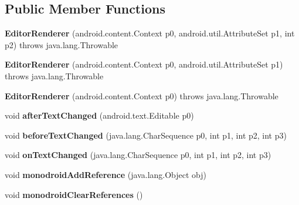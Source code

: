 \subsection*{Public Member Functions}
\begin{DoxyCompactItemize}
\item 
\mbox{\label{classmd5b60ffeb829f638581ab2bb9b1a7f4f3f_1_1EditorRenderer_a126a5ef185db22511cc66e9cafd0d310}} 
{\bfseries Editor\+Renderer} (android.\+content.\+Context p0, android.\+util.\+Attribute\+Set p1, int p2)  throws java.\+lang.\+Throwable 	
\item 
\mbox{\label{classmd5b60ffeb829f638581ab2bb9b1a7f4f3f_1_1EditorRenderer_aea191623f560a580a117cd8f184e59b3}} 
{\bfseries Editor\+Renderer} (android.\+content.\+Context p0, android.\+util.\+Attribute\+Set p1)  throws java.\+lang.\+Throwable 	
\item 
\mbox{\label{classmd5b60ffeb829f638581ab2bb9b1a7f4f3f_1_1EditorRenderer_a2bc23540ae25cddc293e56ebaef99158}} 
{\bfseries Editor\+Renderer} (android.\+content.\+Context p0)  throws java.\+lang.\+Throwable 	
\item 
\mbox{\label{classmd5b60ffeb829f638581ab2bb9b1a7f4f3f_1_1EditorRenderer_a7cc8b388893791b82894b01e4627508d}} 
void {\bfseries after\+Text\+Changed} (android.\+text.\+Editable p0)
\item 
\mbox{\label{classmd5b60ffeb829f638581ab2bb9b1a7f4f3f_1_1EditorRenderer_a96753b901a17611aedda80e2aa4801f8}} 
void {\bfseries before\+Text\+Changed} (java.\+lang.\+Char\+Sequence p0, int p1, int p2, int p3)
\item 
\mbox{\label{classmd5b60ffeb829f638581ab2bb9b1a7f4f3f_1_1EditorRenderer_a5c47c614038fade51dab2c5f57a02d43}} 
void {\bfseries on\+Text\+Changed} (java.\+lang.\+Char\+Sequence p0, int p1, int p2, int p3)
\item 
\mbox{\label{classmd5b60ffeb829f638581ab2bb9b1a7f4f3f_1_1EditorRenderer_ad947b0fcb8dfc7fa6df3ad187936d3be}} 
void {\bfseries monodroid\+Add\+Reference} (java.\+lang.\+Object obj)
\item 
\mbox{\label{classmd5b60ffeb829f638581ab2bb9b1a7f4f3f_1_1EditorRenderer_ab75e496c1b4ff6e3f542989834b44b8d}} 
void {\bfseries monodroid\+Clear\+References} ()
\end{DoxyCompactItemize}
